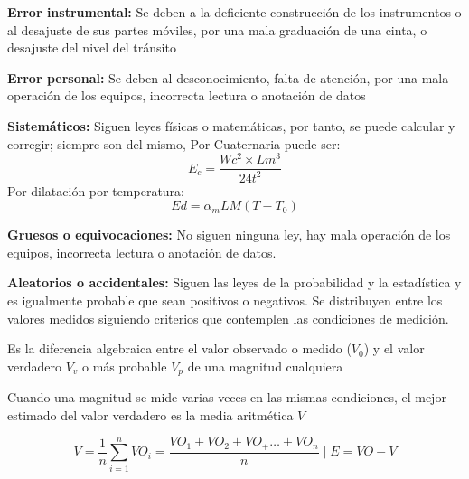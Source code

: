 \begin{example}
    \textbf{Error instrumental:} Se deben a la deficiente construcción de los instrumentos o al desajuste de sus partes móviles, por una mala graduación de una cinta, o desajuste del nivel del tránsito
\end{example}

\begin{example}
    \textbf{Error personal:} Se deben al desconocimiento, falta de atención, por una mala operación de los equipos, incorrecta lectura o anotación de datos
\end{example}

\begin{example}
    \textbf{Sistemáticos:} Siguen leyes físicas o matemáticas, por tanto, se puede calcular y corregir; siempre son del mismo, Por Cuaternaria puede ser:
    \begin{equation}
        E_c=\frac{Wc^2\times Lm^3}{24t^2}
    \end{equation}
    Por dilatación por temperatura: 
    \begin{equation}
        Ed=\alpha_mLM(T-T_0)
    \end{equation}
\end{example}

\begin{example}
    \textbf{Gruesos o equivocaciones:} No siguen ninguna ley, hay mala operación de los equipos, incorrecta lectura o anotación de datos.
\end{example}

\begin{example}
    \textbf{Aleatorios o accidentales:} Siguen las leyes de la probabilidad y la estadística y es igualmente probable que sean positivos o negativos. Se distribuyen entre los valores medidos siguiendo criterios que contemplen las condiciones de medición.
\end{example}

\begin{definition}[Error (E)]
    Es la diferencia algebraica entre el valor observado o medido ($V_0$) y el valor verdadero $V_v$ o más probable $V_p$ de una magnitud cualquiera
\end{definition}
Cuando una magnitud se mide varias veces en las mismas condiciones, el mejor estimado del valor verdadero es la media aritmética $V$

\begin{equation}
    V=\frac{1}{n}\sum_{i=1}^n VO_i=\frac{VO_1+VO_2+VO_+\dots+VO_n}{n}\mid E=VO-V
\end{equation}

